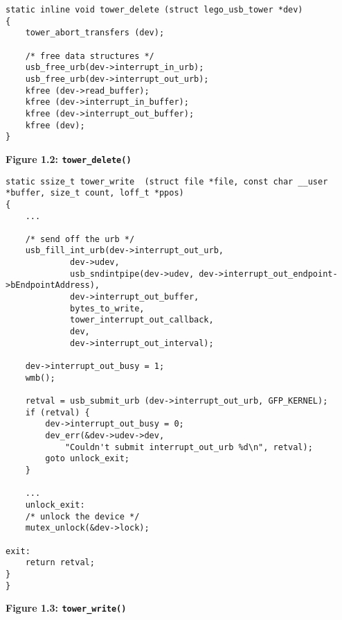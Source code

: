 \documentclass[12pt]{article}
\begin{document}
\begin{lstlisting}[style=CStyle]
static inline void tower_delete (struct lego_usb_tower *dev)
{
	tower_abort_transfers (dev);

	/* free data structures */
	usb_free_urb(dev->interrupt_in_urb);
	usb_free_urb(dev->interrupt_out_urb);
	kfree (dev->read_buffer);
	kfree (dev->interrupt_in_buffer);
	kfree (dev->interrupt_out_buffer);
	kfree (dev);
}
\end{lstlisting}
\centerline{\textbf{Figure 1.2: \texttt{tower\_delete()}}}
\vspace{12pt}

\begin{lstlisting}[style=CStyle]
static ssize_t tower_write	(struct file *file, const char __user *buffer, size_t count, loff_t *ppos)
{
	...
	
	/* send off the urb */
	usb_fill_int_urb(dev->interrupt_out_urb,
			 dev->udev,
			 usb_sndintpipe(dev->udev, dev->interrupt_out_endpoint->bEndpointAddress),
			 dev->interrupt_out_buffer,
			 bytes_to_write,
			 tower_interrupt_out_callback,
			 dev,
			 dev->interrupt_out_interval);

	dev->interrupt_out_busy = 1;
	wmb();

	retval = usb_submit_urb (dev->interrupt_out_urb, GFP_KERNEL);
	if (retval) {
		dev->interrupt_out_busy = 0;
		dev_err(&dev->udev->dev,
			"Couldn't submit interrupt_out_urb %d\n", retval);
		goto unlock_exit;
	}	
	
	...
	unlock_exit:
	/* unlock the device */
	mutex_unlock(&dev->lock);

exit:
	return retval;
}
}
\end{lstlisting}
\centerline{\textbf{Figure 1.3: \texttt{tower\_write()}}}
\vspace{12pt}
\end{document}
